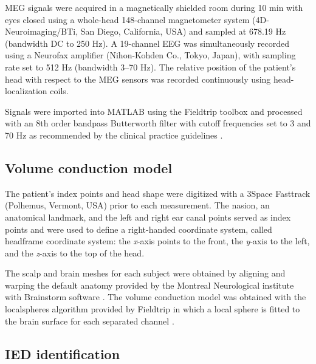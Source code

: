 MEG signals were acquired in a magnetically shielded room during 10 min with eyes closed using a whole-head 148-channel magnetometer system (4D-Neuroimaging/BTi, San Diego, California, USA) and sampled at 678.19 Hz (bandwidth DC to 250 Hz). A 19-channel EEG was simultaneously recorded using a Neurofax amplifier (Nihon-Kohden Co., Tokyo, Japan), with sampling rate set to 512 Hz (bandwidth 3–70 Hz). The relative position of the patient's head with respect to the MEG sensors was recorded continuously using head-localization coils.

Signals were imported into MATLAB using the Fieldtrip toolbox \citep{Oostenveld2011} and processed with an 8th order bandpass Butterworth filter with cutoff frequencies set to 3 and 70 Hz as recommended by the clinical practice guidelines \citep{Bagic2011}.

\subsection{Volume conduction model} \label{sec:VCM}

The patient's index points and head shape were digitized with a 3Space Fasttrack (Polhemus, Vermont, USA) prior to each measurement. The nasion, an anatomical landmark, and the left and right ear canal points served as index points and were used to define a right-handed coordinate system, called headframe coordinate system: the \textit{x}-axis points to the front, the \textit{y}-axis to the left, and the \textit{z}-axis to the top of the head.

The scalp and brain meshes for each subject were obtained by aligning and warping the default anatomy provided by the Montreal Neurological institute with Brainstorm software \citep{Tadel2011}. The volume conduction model was obtained with the localspheres algorithm provided by Fieldtrip in which a local sphere is fitted to the brain surface for each separated channel \citep{Huang1999}.

\subsection{IED identification}


